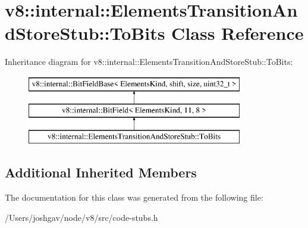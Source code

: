 \hypertarget{classv8_1_1internal_1_1_elements_transition_and_store_stub_1_1_to_bits}{}\section{v8\+:\+:internal\+:\+:Elements\+Transition\+And\+Store\+Stub\+:\+:To\+Bits Class Reference}
\label{classv8_1_1internal_1_1_elements_transition_and_store_stub_1_1_to_bits}
Inheritance diagram for v8\+:\+:internal\+:\+:Elements\+Transition\+And\+Store\+Stub\+:\+:To\+Bits\+:\begin{figure}[H]
\begin{center}
\leavevmode
\includegraphics[height=3.000000cm]{classv8_1_1internal_1_1_elements_transition_and_store_stub_1_1_to_bits}
\end{center}
\end{figure}
\subsection*{Additional Inherited Members}


The documentation for this class was generated from the following file\+:\begin{DoxyCompactItemize}
\item 
/\+Users/joshgav/node/v8/src/code-\/stubs.\+h\end{DoxyCompactItemize}
